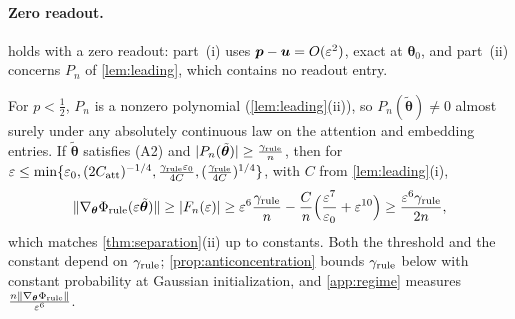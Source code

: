 \paragraph{Zero readout.}\label{rem:zero-readout}  holds with a zero readout: part~(i) uses $\bm p-\bm u=O(\varepsilon^2)$, exact at $\bm\theta_0$, and part~(ii) concerns $P_n$ of
\cref{lem:leading}, which contains no readout entry.


\begin{remark}
\label{rem:generic-rule}
For $p<\frac{1}{2}$, $P_n$ is a nonzero polynomial (\cref{lem:leading}(ii)), so $P_n(\tilde{\bm\theta})\ne0$ almost surely under any absolutely continuous law on
the attention and embedding entries. If $\tilde{\bm\theta}$ satisfies (A2) and $|P_n(\tilde{\bm\theta})|\ge\frac{\gamma_{\mathrm{rule}}}{n}$, then for
$\varepsilon\le\min\{\varepsilon_0,(2C_{\mathrm{att}})^{-1/4},\frac{\gamma_{\mathrm{rule}}\varepsilon_0}{4C},(\frac{\gamma_{\mathrm{rule}}}{4C})^{1/4}\}$, with $C$ from \cref{lem:leading}(i),
\[
 \|\nabla_{\bm\theta}\Phi_{\mathrm{rule}}(\varepsilon\tilde{\bm\theta})\|\ge|F_n(\varepsilon)|\ge\varepsilon^6\frac{\gamma_{\mathrm{rule}}}{n}-\frac{C}{n}\Bigl(\frac{\varepsilon^7}{\varepsilon_0}+\varepsilon^{10}\Bigr)\ge\frac{\varepsilon^6\gamma_{\mathrm{rule}}}{2n},
\]
which matches \cref{thm:separation}(ii) up to constants. Both the threshold and the constant depend on $\gamma_{\mathrm{rule}}$; \cref{prop:anticoncentration} bounds
$\gamma_{\mathrm{rule}}$ below with constant probability at Gaussian initialization, and \cref{app:regime} measures $\frac{n\|\nabla_{\bm\theta}\Phi_{\mathrm{rule}}\|}{\varepsilon^6}$.
\end{remark}

